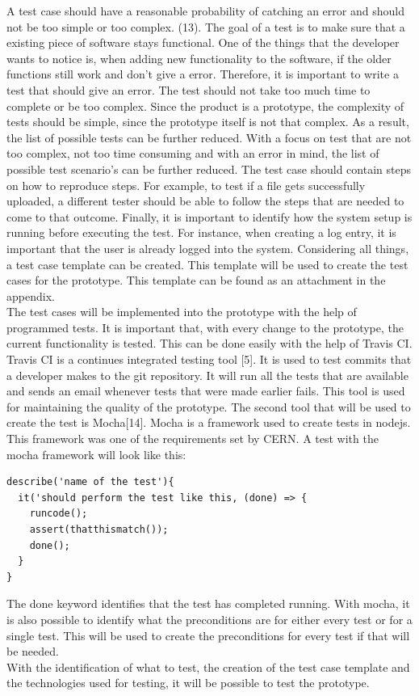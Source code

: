\documentclass[paper=a4, fontsize=11pt,twoside]{scrartcl}	%
\begin{document}
A test case should have a reasonable probability of catching an error and should not be too simple or too complex. (13). The goal of a test is to make sure that a existing piece of software stays functional. One of the things that the developer wants to notice is, when adding new functionality to the software, if the older functions still work and don't give a error. Therefore, it is important to write a test  that should give an error. The test should not take too much time to complete or be too complex. Since the product is a prototype, the complexity of tests should be simple, since the prototype itself is not that complex.  As a result, the list of possible tests can be further reduced. With a focus on test that are not too complex, not too time consuming and with an error in mind, the list of possible test scenario's can be further reduced.  The test case should contain steps on how to reproduce steps. For example, to test if a file gets successfully uploaded, a different tester should be able to follow the steps that are needed to come to that outcome. Finally, it is important to identify how the system setup is running before executing the test. For instance, when creating a log entry, it is important that the user is already logged into the system. Considering all things, a test case template can be created. This template will be used to create the test cases for the prototype. This template can be found as an attachment in the appendix. \\
The test cases will be implemented into the prototype with the help of programmed tests. It is important that, with every change to the prototype, the current functionality is tested. This can be done easily with the help of Travis CI. Travis CI is a continues integrated testing tool [5]. It is used to test commits that a developer makes to the git repository. It will run all the tests that are available and sends an email whenever tests that were made earlier fails. This tool is used for maintaining the quality of the prototype. The second tool that will be used to create the test is Mocha[14]. Mocha is a framework used to create tests in nodejs. This framework was one of the requirements set by CERN. A test with the mocha framework will look like this:
\begin{lstlisting}[frame=single]
describe('name of the test'){
  it('should perform the test like this, (done) => {
    runcode();
    assert(thatthismatch());
    done();
  }
}
\end{lstlisting} 
The done keyword identifies that the test has completed running. With mocha, it is also possible to identify what the preconditions are for either every test or for a single test. This will be used to create the preconditions for every test if that will be needed.\\
With the identification of what to test, the creation of the test case template and the technologies used for testing, it will be possible to test the prototype.
\newpage
\end{document}
